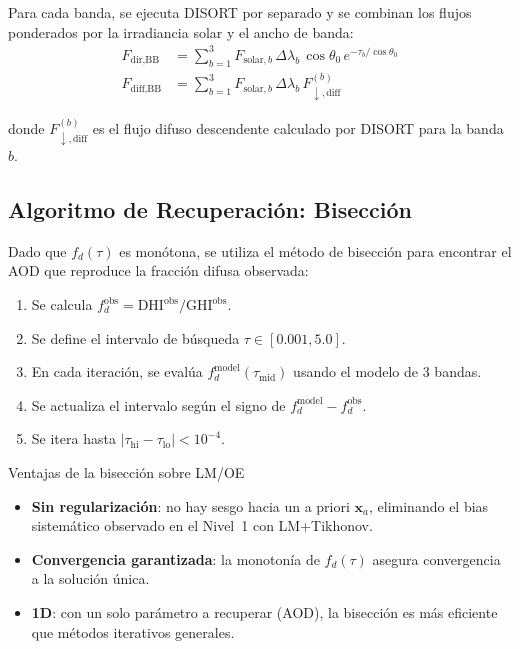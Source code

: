 \documentclass[a4paper,11pt]{article}
\begin{document}
Para cada banda, se ejecuta DISORT por separado y se combinan los flujos
ponderados por la irradiancia solar y el ancho de banda:
\begin{align}
    F_{\text{dir,BB}} &= \sum_{b=1}^{3} F_{\text{solar},b}\,\Delta\lambda_b\,
    \cos\theta_0\,e^{-\tau_b/\cos\theta_0}\\
    F_{\text{diff,BB}} &= \sum_{b=1}^{3} F_{\text{solar},b}\,\Delta\lambda_b\,
    F_{\downarrow,\text{diff}}^{(b)}
\end{align}

donde $F_{\downarrow,\text{diff}}^{(b)}$ es el flujo difuso descendente
calculado por DISORT para la banda $b$.

\subsection{Algoritmo de Recuperaci\'on: Bisecci\'on}

Dado que $f_d(\tau)$ es mon\'otona, se utiliza el m\'etodo de bisecci\'on para
encontrar el AOD que reproduce la fracci\'on difusa observada:

\begin{enumerate}
    \item Se calcula $f_d^{\text{obs}} = \text{DHI}^{\text{obs}} / \text{GHI}^{\text{obs}}$.
    \item Se define el intervalo de b\'usqueda $\tau \in [0.001, 5.0]$.
    \item En cada iteraci\'on, se eval\'ua $f_d^{\text{model}}(\tau_{\text{mid}})$
          usando el modelo de 3 bandas.
    \item Se actualiza el intervalo seg\'un el signo de
          $f_d^{\text{model}} - f_d^{\text{obs}}$.
    \item Se itera hasta $|\tau_{\text{hi}} - \tau_{\text{lo}}| < 10^{-4}$.
\end{enumerate}

\begin{concept}{Ventajas de la bisecci\'on sobre LM/OE}
\begin{itemize}
    \item \textbf{Sin regularizaci\'on}: no hay sesgo hacia un a priori
          $\mathbf{x}_a$, eliminando el bias sistem\'atico observado en el
          Nivel~1 con LM+Tikhonov.
    \item \textbf{Convergencia garantizada}: la monoton\'ia de $f_d(\tau)$
          asegura convergencia a la soluci\'on \'unica.
    \item \textbf{1D}: con un solo par\'ametro a recuperar (AOD), la
          bisecci\'on es m\'as eficiente que m\'etodos iterativos generales.
\end{itemize}
\end{concept}
\end{document}
